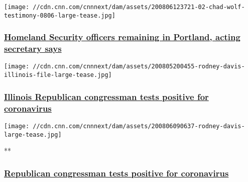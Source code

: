 \href{/2020/08/06/politics/wolf-defends-dhs-portland/index.html}{}

\texttt{[image: //cdn.cnn.com/cnnnext/dam/assets/200806123721-02-chad-wolf-testimony-0806-large-tease.jpg]}

\hypertarget{homeland-security-officers-remaining-in-portland-acting-secretary-says}{%
\subsubsection{\texorpdfstring{\href{/2020/08/06/politics/wolf-defends-dhs-portland/index.html}{Homeland
Security officers remaining in Portland, acting secretary
says}}{Homeland Security officers remaining in Portland, acting secretary says}}\label{homeland-security-officers-remaining-in-portland-acting-secretary-says}}

\href{/2020/08/05/politics/republican-congressman-tests-positive-coronavirus-rodney-davis-illinois/index.html}{}

\texttt{[image: //cdn.cnn.com/cnnnext/dam/assets/200805200455-rodney-davis-illinois-file-large-tease.jpg]}

\hypertarget{illinois-republican-congressman-tests-positive-for-coronavirus}{%
\subsubsection{\texorpdfstring{\href{/2020/08/05/politics/republican-congressman-tests-positive-coronavirus-rodney-davis-illinois/index.html}{Illinois
Republican congressman tests positive for
coronavirus}}{Illinois Republican congressman tests positive for coronavirus}}\label{illinois-republican-congressman-tests-positive-for-coronavirus}}

\href{/videos/politics/2020/08/06/rodney-davis-illinois-tests-positive-coronavirus-newday-intv-vpx.cnn}{}

\texttt{[image: //cdn.cnn.com/cnnnext/dam/assets/200806090637-rodney-davis-large-tease.jpg]}

**

\hypertarget{republican-congressman-tests-positive-for-coronavirus-}{%
\subsubsection{\texorpdfstring{\href{/videos/politics/2020/08/06/rodney-davis-illinois-tests-positive-coronavirus-newday-intv-vpx.cnn}{Republican
congressman tests positive for coronavirus
}}{Republican congressman tests positive for coronavirus }}\label{republican-congressman-tests-positive-for-coronavirus-}}

